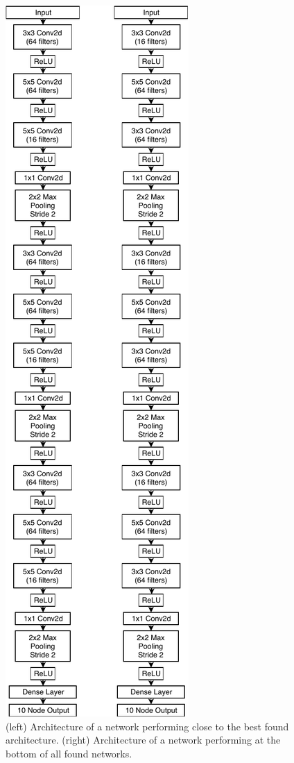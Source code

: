 \documentclass[conference]{IEEEtran}
\begin{document}
\begin{figure}
  \centering
  \includegraphics[height=.95\textheight]{img/good-bad}
  \caption{(left) Architecture of a network performing close to the
    best found architecture. (right) Architecture of a network performing
    at the bottom of all found networks.}
  \label{fig:good-bad}
\end{figure}
\end{document}
